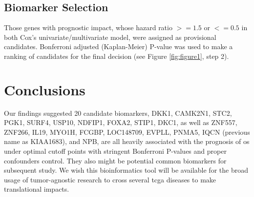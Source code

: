 \documentclass[cancers,article,submit,moreauthors,pdftex]{Definitions/mdpi}
\begin{document}
\begin{paracol}{2}
\subsection*{Biomarker Selection}

Those genes with prognostic impact, whose hazard ratio $>=1.5$ or $<=0.5$ in both Cox's univariate/multivariate model, were assigned as provisional candidates.
Bonferroni adjusted (Kaplan-Meier) P-value was used to make a ranking of candidates for the final decision (see Figure \ref{fig:figure1}, step 2).


\section{Conclusions}


Our findings suggested 20 candidate biomarkers, DKK1, CAMK2N1, STC2, PGK1, SURF4, USP10, NDFIP1, FOXA2, STIP1, DKC1, as well as ZNF557, ZNF266, IL19, MYO1H, FCGBP, LOC148709, EVPLL, PNMA5, IQCN (previous name as KIAA1683), and NPB, are all heavily associated with the prognosis of \acrshort{os} under optimal cutoff points with stringent Bonferroni P-values and proper confounders control. They also might be potential common biomarkers for subsequent study.
We wish this bioinformatics tool will be available for the broad usage of tumor-agnostic research\cite{Looney2020} to cross several \acrshort{tcga} diseases to make translational impacts. %



\vspace{6pt} 




\end{paracol}
\end{document}
